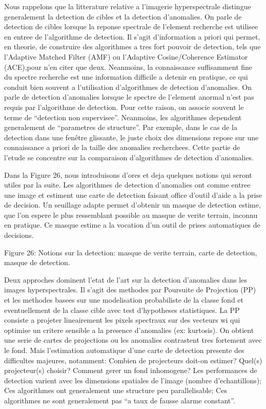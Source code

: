 Nous rappelons que la litterature relative a l'imagerie hyperspectrale
distingue generalement la detection de cibles et la detection
d'anomalies.  On parle de detection de cibles lorsque la reponse
spectrale de l'element recherche est utilisee en entree de
l'algorithme de detection. Il s'agit d'information a priori qui
permet, en theorie, de construire des algorithmes a tres fort pouvoir
de detection, tels que l'Adaptive Matched Filter (AMF) ou l'Adaptive
Cosine/Coherence Estimator (ACE),pour n'en citer que deux. Neanmoins,
la connaissance suffisamment fine du spectre recherche est une
information difficile a detenir en pratique, ce qui conduit bien
souvent a l'utilisation d'algorithmes de detection d'anomalies.  On
parle de detection d'anomalies lorsque le spectre de l'element anormal
n'est pas requis par l'algorithme de detection. Pour cette raison, on
associe souvent le terme de ``detection non supervisee''. Neanmoins,
les algorithmes dependent generalement de ``parametres de
  structure''. Par exemple, dans le cas de la detection dans une
fenêtre glissante, le juste choix des dimensions repose sur une
connaissance a priori de la taille des anomalies recherchees. Cette
partie de l'etude se concentre sur la comparaison d'algorithmes de
detection d'anomalies.

Dans la Figure 26, nous introduisons d'ores et deja quelques notions
qui seront utiles par la suite. Les algorithmes de detection
d'anomalies ont comme entree une image et estiment une carte de
detection faisant office d'outil d'aide a la prise de decision. Un
seuillage adapte permet d'obtenir un masque de detection estime, que
l'on espere le plus ressemblant possible au masque de verite terrain,
inconnu en pratique. Ce masque estime a la vocation d'un outil de
prises automatiques de decisions.

Figure 26: Notions sur la detection: masque de verite terrain, carte
de detection, masque de detection.

Deux approches dominent l'etat de l'art sur la detection d'anomalies
dans les images hyperspectrales. Il s'agit des methodes par Poursuite
de Projection (PP) et les methodes basees sur une modelisation
probabiliste de la classe fond et eventuellement de la classe cible
avec test d'hypotheses statistiques.  La PP consiste a projeter
lineairement les pixels spectraux sur des vecteurs wi qui optimise un
critere sensible a la presence d'anomalies (ex: kurtosis). On obtient
une serie de cartes de projections ou les anomalies contrastent tres
fortement avec le fond. Mais l'estimation automatique d'une carte de
detection presente des difficultes majeures, notamment: Combien de
projecteurs doit-on estimer?  Quel(s) projecteur(s) choisir?  Comment
gerer un fond inhomogene?  Les performances de detection varient avec
les dimensions spatiales de l'image (nombre d'echantillons); Ces
algorithmes ont generalement une structure peu parallelisable; Ces
algorithmes ne sont generalement pas ``a taux de fausse alarme
  constant''.

